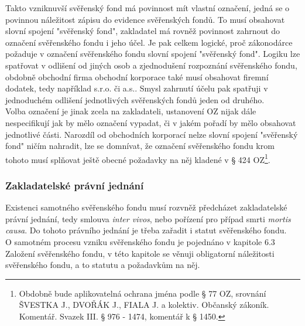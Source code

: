\documentclass{article}
\begin{document}
Takto vzniknuvší svěřenský fond má povinnost mít vlastní označení, jedná se o povinnou náležitost zápisu do evidence svěřenských fondů. To musí obsahovat slovní spojení "svěřenský fond", zakladatel má rovněž povinnost zahrnout do označení svěřenského fondu i jeho účel. Je pak celkem logické, proč zákonodárce požaduje v označení svěřenského fondu slovní spojení "svěřenský fond". Logiku lze spatřovat v odlišení od jiných osob a zjednodušení rozpoznání svěřenského fondu, obdobně obchodní firma obchodní korporace také musí obsahovat firemní dodatek, tedy například s.r.o. či a.s.. Smysl zahrnutí účelu pak spatřuji v jednoduchém odlišení jednotlivých svěřenských fondů jeden od druhého.\\

Volba označení je jinak zcela na zakladateli, ustanovení OZ nijak dále nespecifikují jak by mělo označení vypadat, či v jakém pořadí by mělo obsahovat jednotlivé části. Narozdíl od obchodních korporací nelze slovní spojení "svěřenský fond" ničím nahradit, lze se domnívat, že označení svěřenského fondu krom tohoto musí splňovat ještě obecné požadavky na něj kladené v § 424 OZ\footnote{Obdobně bude aplikovatelná ochrana jména podle § 77 OZ, srovnání ŠVESTKA J., DVOŘÁK J., FIALA J. a kolektiv. Občanský zákoník. Komentář. Svazek III. § 976 - 1474, komentář k § 1450.}.\\

\subsubsection{Zakladatelské právní jednání}

Existenci samotného svěřenského fondu musí rozvněž předcházet zakladatelské právní jednání, tedy smlouva \textit{inter vivos}, nebo pořízení pro případ smrti \textit{mortis causa}. Do tohoto právního jednání je třeba zařadit i statut svěřenského fondu.\\

O samotném procesu vzniku svěřenského fondu je pojednáno v kapitole 6.3 Založení svěřenského fondu, v této kapitole se věnuji obligatorní náležitosti svěřenského fondu, a to statutu a požadavkům na něj.\\
\end{document}

